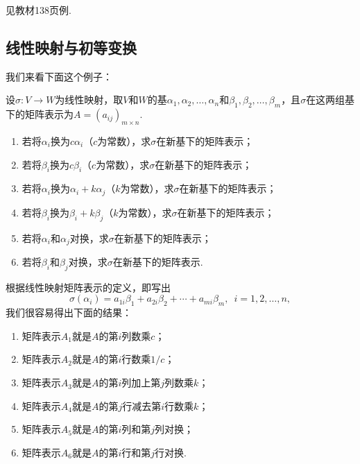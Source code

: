 \begin{solution}
    见教材138页例.
\end{solution}

\subsection{线性映射与初等变换}

我们来看下面这个例子：
\begin{example}{}{}
    设$\sigma:V\to W$为线性映射，取$V$和$W$的基$\alpha_1,\alpha_2,\ldots,\alpha_n$和$\beta_1,\beta_2,\ldots,\beta_m$，且$\sigma$在这两组基下的矩阵表示为$A=(a_{ij})_{m\times n}$.
    \begin{enumerate}
        \item 若将$\alpha_i$换为$c\alpha_i$（$c$为常数），求$\sigma$在新基下的矩阵表示；

        \item 若将$\beta_i$换为$c\beta_i$（$c$为常数），求$\sigma$在新基下的矩阵表示；

        \item 若将$\alpha_i$换为$\alpha_i+k\alpha_j$（$k$为常数），求$\sigma$在新基下的矩阵表示；

        \item 若将$\beta_i$换为$\beta_i+k\beta_j$（$k$为常数），求$\sigma$在新基下的矩阵表示；

        \item 若将$\alpha_i$和$\alpha_j$对换，求$\sigma$在新基下的矩阵表示；

        \item 若将$\beta_i$和$\beta_j$对换，求$\sigma$在新基下的矩阵表示.
    \end{enumerate}
\end{example}

\begin{solution}
    根据线性映射矩阵表示的定义，即写出
    \[\sigma(\alpha_i)=a_{1i}\beta_1+a_{2i}\beta_2+\cdots+a_{mi}\beta_m,\enspace i=1,2,\ldots,n,\]
    我们很容易得出下面的结果：
    \begin{enumerate}
        \item 矩阵表示$A_1$就是$A$的第$i$列数乘$c$；

        \item 矩阵表示$A_2$就是$A$的第$i$行数乘$1/c$；

        \item 矩阵表示$A_3$就是$A$的第$i$列加上第$j$列数乘$k$；

        \item 矩阵表示$A_4$就是$A$的第$j$行减去第$i$行数乘$k$；

        \item 矩阵表示$A_5$就是$A$的第$i$列和第$j$列对换；

        \item 矩阵表示$A_6$就是$A$的第$i$行和第$j$行对换.
    \end{enumerate}
\end{solution}

